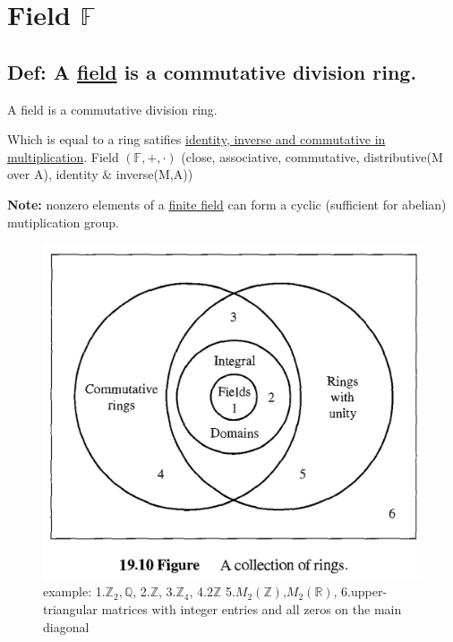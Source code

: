 \documentclass[11pt]{elegantbook}
\begin{document}
\section{Field $\mathbb{F}$}
\subsection{Def: A \underline{field} is a commutative division ring.}
\begin{definition}
    A field is a commutative division ring.
\end{definition}
Which is equal to a ring satifies \underline{identity, inverse and commutative in multiplication}.
Field $(\mathbb{F}, +, \cdot)$ (close, associative, commutative, distributive(M over A), identity $\&$ inverse(M,A))

\textbf{Note:} nonzero elements of a \underline{finite field} can form a cyclic (sufficient for abelian) mutiplication group.

\begin{center}\begin{figure}[htbp]
    \centering
    \includegraphics[scale=0.5]{collection of rings.png}
    \caption{example: 1.$\mathbb{Z}_2,\mathbb{Q}$, 2.$\mathbb{Z}$, 3.$\mathbb{Z}_4$, 4.$2\mathbb{Z}$ 5.$M_2(\mathbb{Z})$,$M_2(\mathbb{R})$, 6.upper-triangular matrices with integer entries and all zeros on the main diagonal}
    \label{}
\end{figure}\end{center}
\end{document}

